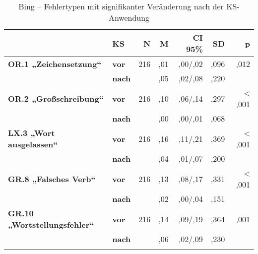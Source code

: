 \begin{table}
\begin{tabularx}{\textwidth}{llrrrrr}

\lsptoprule
& \textbf{KS} & \textbf{N} & \textbf{M} & \textbf{CI 95\%} & \textbf{SD} & \textbf{p}\\
\midrule
\textbf{OR.1 „Zeichensetzung“} & \textbf{vor} & 216 & ,01 & ,00/,02 & ,096 & ,012\\
& \textbf{nach} & & ,05 & ,02/,08 & ,220 & \\
\tablevspace
\textbf{OR.2 „Großschreibung“} & \textbf{vor} & 216 & ,10 & ,06/,14 & ,297 & < ,001\\
& \textbf{nach} & & ,00 & ,00/,01 & ,068 & \\
\tablevspace
\textbf{LX.3 „Wort ausgelassen“} & \textbf{vor} & 216 & ,16 & ,11/,21 & ,369 & < ,001\\
& \textbf{nach} &  & ,04 & ,01/,07 & ,200 & \\
\tablevspace
\textbf{GR.8 „Falsches Verb“}& \textbf{vor} & 216 & ,13 & ,08/,17 & ,331 & < ,001\\
& \textbf{nach} & & ,02 & ,00/,04 & ,151 & \\
\tablevspace
\textbf{GR.10 „Wortstellungsfehler“} & \textbf{vor} & 216 & ,14 & ,09/,19 & ,364 &  ,001\\
& \textbf{nach} & & ,06 & ,02/,09 & ,230 & \\
\lspbottomrule
\end{tabularx}
\caption{\label{tab:05:92}Bing -- Fehlertypen mit signifikanter Veränderung nach der KS-Anwendung   }
\end{table}

